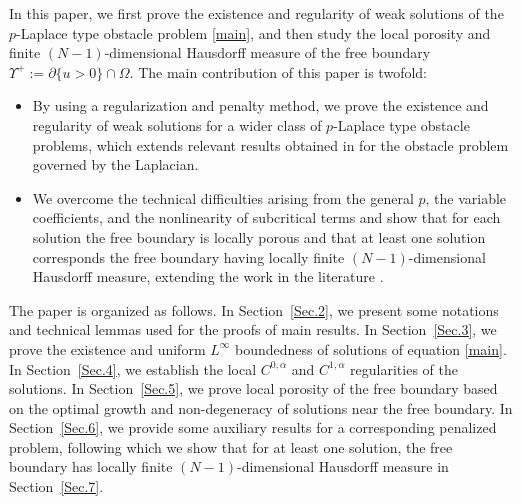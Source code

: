 \documentclass[onecolumn]{autart}
\begin{document}


In this paper, we first prove the existence and regularity of weak solutions of   the $p$-Laplace type obstacle problem   \eqref{main}, and then  study the local porosity and finite  $(N-1)$-dimensional Hausdorff measure of the free boundary $\Upsilon^+ := \partial\{u>0\} \cap \Omega$. %
%
The main contribution  of this paper is twofold:

\begin{itemize}
	\item By using a regularization and penalty method, we prove the existence and regularity of weak solutions for  a wider class of $p$-Laplace type obstacle problems, which extends relevant results obtained  in \cite{Wang:2025} for the obstacle problem governed by the Laplacian.
	
	\item We overcome the technical difficulties arising from  the general $p$, the variable coefficients, and   the nonlinearity of subcritical terms and show that for each solution the free boundary  is locally porous and  that   at least one solution corresponds the free boundary   having locally finite $(N-1)$-dimensional Hausdorff measure,   extending the  work in the literature \cite{Wang:2025,Karp:2000,Lee:2003,Zhao:2012,Hu:2025,Andersson:2015,Zheng:2013}.
\end{itemize}



The paper is organized as follows. In Section~\ref{Sec.2}, we present some   notations and technical lemmas used for the proofs of  main results. In Section~\ref{Sec.3}, we prove the existence  and uniform $L^\infty$ boundedness of solutions of equation \eqref{main}. In Section~\ref{Sec.4}, we establish the local $C^{0,\alpha}$ and $C^{1,\alpha}$ regularities of the solutions. In Section~\ref{Sec.5}, we prove local porosity of the free boundary based on the optimal growth and non-degeneracy of solutions near the free boundary. In Section~\ref{Sec.6}, we provide some auxiliary results for a corresponding penalized problem, following which we show that for at least one solution, the free boundary has locally finite $(N-1)$-dimensional Hausdorff measure in Section~\ref{Sec.7}.
\end{document}
